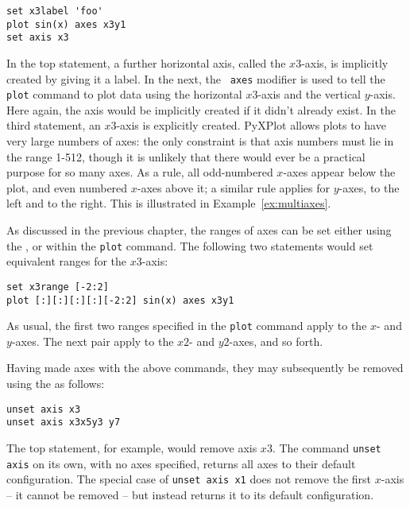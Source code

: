 \begin{verbatim}
set x3label 'foo'
plot sin(x) axes x3y1
set axis x3
\end{verbatim}

\noindent In the top statement, a further horizontal axis, called the
$x3$-axis, is implicitly created by giving it a label. In the next, the {\tt
axes} modifier is used to tell the {\tt plot} command to plot data using the
horizontal $x3$-axis and the vertical $y$-axis. Here again, the axis would be
implicitly created if it didn't already exist.  In the third statement, an
$x3$-axis is explicitly created.  PyXPlot allows plots to have very large
numbers of axes: the only constraint is that axis numbers must lie in the range
1-512, though it is unlikely that there would ever be a practical purpose for
so many axes.  As a rule, all odd-numbered $x$-axes appear below the plot, and
even numbered $x$-axes above it; a similar rule applies for $y$-axes, to the
left and to the right.  This is illustrated in Example~\ref{ex:multiaxes}.


As discussed in the previous chapter, the ranges of axes can be set either
using the , or within the {\tt plot} command. The following
two statements would set equivalent ranges for the $x3$-axis:

\begin{verbatim}
set x3range [-2:2]
plot [:][:][:][:][-2:2] sin(x) axes x3y1
\end{verbatim}

\noindent As usual, the first two ranges specified in the {\tt plot} command
apply to the $x$- and $y$-axes. The next pair apply to the $x2$- and $y2$-axes,
and so forth.

 Having made axes
with the above commands, they may subsequently be removed using the
 as follows:

\begin{verbatim}
unset axis x3
unset axis x3x5y3 y7
\end{verbatim}

\noindent The top statement, for example, would remove axis $x3$. The command
{\tt unset axis} on its own, with no axes specified, returns all axes to
their default configuration.  The special case of {\tt unset axis x1} does
not remove the first $x$-axis -- it cannot be removed -- but instead returns it
to its default configuration.

